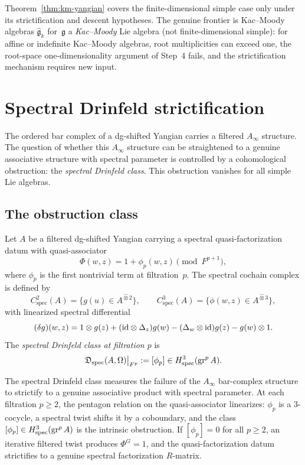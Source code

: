 \begin{remark}
\label{rem:km-frontier}
Theorem~\ref{thm:km-yangian} covers the finite-dimensional simple
case only under its strictification and descent hypotheses. The
genuine frontier is Kac--Moody algebras
$\widehat{\mathfrak{g}}_k$ for~$\mathfrak{g}$ a
\emph{Kac--Moody} Lie algebra (not finite-dimensional
simple): for affine or indefinite Kac--Moody algebras,
root multiplicities can exceed one, the root-space
one-dimensionality argument of Step~4 fails, and the
strictification mechanism requires new input.
\end{remark}


\section{Spectral Drinfeld strictification}
\label{sec:spectral-drinfeld-strictification}

The ordered bar complex of a dg-shifted Yangian carries a filtered
$A_\infty$ structure. The question of whether this $A_\infty$ structure
can be straightened to a genuine associative structure with spectral
parameter is controlled by a cohomological obstruction: the
\emph{spectral Drinfeld class}. This
obstruction vanishes for all simple Lie algebras.

\subsection{The obstruction class}

\begin{definition}
\ClaimStatusProvedHere
\label{def:spectral-drinfeld-class-app}
Let $A$ be a filtered dg-shifted Yangian carrying a spectral
quasi-factorization datum with quasi-associator
\[
\Phi(w,z)=1+\phi_p(w,z)\pmod{F^{p+1}},
\]
where $\phi_p$ is the first nontrivial term at filtration~$p$.
The spectral cochain complex is defined by
\[
C^2_{\mathrm{spec}}(A)=\{g(u)\in A^{\widehat\otimes 2}\},
\qquad
C^3_{\mathrm{spec}}(A)=\{\phi(w,z)\in A^{\widehat\otimes 3}\},
\]
with linearized spectral differential
\[
(\delta g)(w,z)
=
1\otimes g(z)
+ (\mathrm{id}\otimes \Delta_z)g(w)
- (\Delta_w\otimes \mathrm{id})g(z)
- g(w)\otimes 1.
\]
The \emph{spectral Drinfeld class at filtration $p$} is
\[
\mathfrak D_{\mathrm{spec}}(A,\Omega)\big|_{F^p}
:=[\phi_p]
\in H^3_{\mathrm{spec}}(\operatorname{gr}^p A).
\]
\end{definition}

\begin{remark}[Interpretation]
The spectral Drinfeld class measures the failure of the $A_\infty$
bar-complex structure to strictify to a genuine associative product
with spectral parameter. At each filtration $p\ge 2$, the pentagon
relation on the quasi-associator linearizes: $\phi_p$ is a $3$-cocycle,
a spectral twist shifts it by a coboundary, and the class
$[\phi_p]\in H^3_{\mathrm{spec}}(\operatorname{gr}^p A)$ is the intrinsic
obstruction. If $[\phi_p]=0$ for all $p\ge 2$, an iterative
filtered twist produces $\Phi^G=1$, and the quasi-factorization
datum strictifies to a genuine spectral factorization $R$-matrix.
\end{remark}

